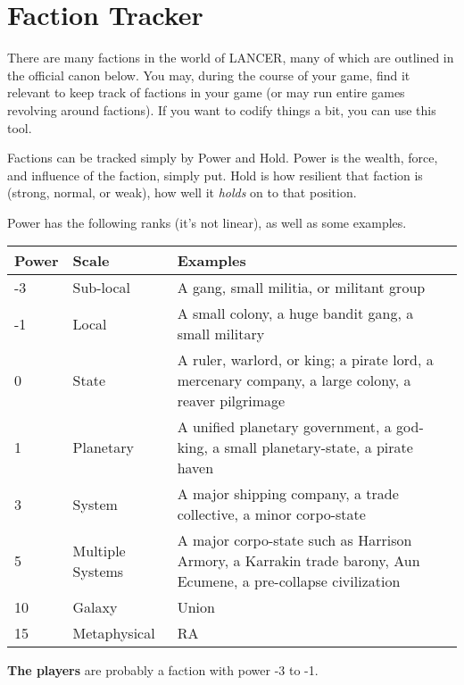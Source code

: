 \section{Faction Tracker}
There are many factions in the world of LANCER, many of which are outlined in the official canon
below. You may, during the course of your game, find it relevant to keep track of factions in your
game (or may run entire games revolving around factions). If you want to codify things a bit, you
can use this tool.

Factions can be tracked simply by Power and Hold. Power is the wealth, force, and influence of
the faction, simply put. Hold is how resilient that faction is (strong, normal, or weak), how well it
\textit{holds} on to that position.

Power has the following ranks (it’s not linear), as well as some examples.

\begin{center}
    \begin{tabular}{| l | l | p{8cm} |}
        \hline
        Power & Scale & Examples \\ \hline
        -3 & Sub-local & A gang, small militia, or militant group \\ \hline
        -1 & Local & A small colony, a huge bandit gang, a small military \\ \hline
        0 & State & A ruler, warlord, or king; a pirate lord, a mercenary company, a large colony, a reaver pilgrimage \\ \hline
        1 & Planetary & A unified planetary government, a god-king, a small planetary-state, a pirate haven \\ \hline
        3 & System & A major shipping company, a trade collective, a minor corpo-state \\ \hline
        5 & Multiple Systems & A major corpo-state such as Harrison Armory, a Karrakin trade barony, Aun Ecumene, a pre-collapse civilization \\ \hline
        10 & Galaxy & Union \\ \hline
        15 & Metaphysical & RA \\ \hline
    \end{tabular}
\end{center}

\textbf{The players} are probably a faction with power -3 to -1.


